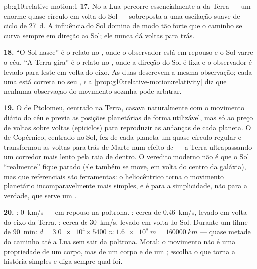 \begin{solution}{pb:g10:relative-motion:1}
\textbf{17.} No  a Lua percorre essencialmente a
 da Terra --- um enorme quase-círculo em volta do Sol ---
sobreposta a uma oscilação suave de ciclo de \qty{27}{d}. A influência do
Sol domina de modo tão forte que o caminho se curva sempre em direção ao
Sol; ele nunca dá voltas para trás.

\textbf{18.} ``O Sol nasce'' é o relato no , onde o
observador está em repouso e o Sol varre o céu. ``A Terra gira'' é o
relato no , onde a direção do Sol é fixa e o
observador é levado para leste em volta do eixo. As duas descrevem a
mesma observação; cada uma está correta no seu , e a
\cref{prop:g10:relative-motion:relativity} diz que nenhuma observação do
movimento sozinha pode arbitrar.

\textbf{19.} O  de Ptolomeu, centrado na Terra, casava
naturalmente com o movimento diário do céu e previa as posições
planetárias de forma utilizável, mas só ao preço de voltas sobre voltas
(epiciclos) para reproduzir as andanças de cada planeta. O  de
Copérnico, centrado no Sol, fez de cada planeta um quase-círculo regular
e transformou as voltas para trás de Marte num efeito de  ---
a Terra ultrapassando um corredor mais lento pela raia de dentro. O
veredito moderno não é que o Sol ``realmente'' fique parado (ele também
se move, em volta do centro da galáxia), mas que referenciais são
ferramentas: o heliocêntrico torna o movimento planetário
incomparavelmente mais simples, e é para a simplicidade, não para a
verdade, que serve um .

\textbf{20.} : \qty{0}{km/s} --- em repouso na
poltrona. : cerca de \qty{0.46}{km/s}, levado em
volta do eixo da Terra. : cerca de
\qty{30}{km/s}, levado em volta do Sol. Durante um filme de
\qty{90}{min}: $d = \num{3.0e4} \times 5400 \approx \qty{1.6e8}{m}
= \qty{160000}{km}$ --- quase metade do caminho até a Lua sem sair da
poltrona. Moral: o movimento não é uma propriedade de um corpo, mas de um
corpo e de um ; escolha o  que torna a história
simples e diga sempre qual foi.
\end{solution}
